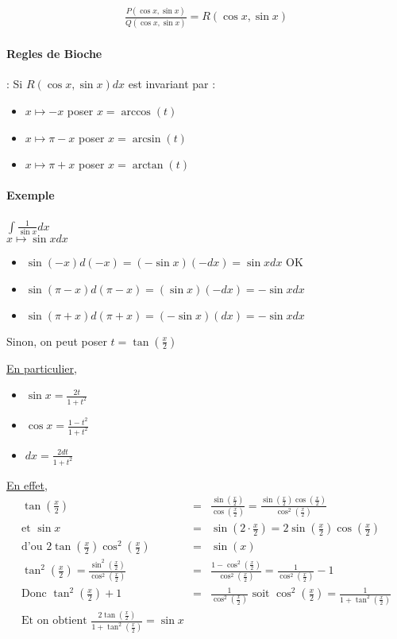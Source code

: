 \[\begin{array}{c}
	\frac{P(\cos x, \sin x)}{Q(\cos x, \sin x)} = R(\cos x, \sin x) \end{array}\]

\paragraph{Regles de Bioche} : Si $R(\cos x, \sin x) dx$ est invariant par : \begin{itemize}
\item $x \mapsto -x$ poser $x = \arccos (t)$ 
\item $x \mapsto \pi - x$ poser $x = \arcsin (t)$
\item $x \mapsto \pi + x$ poser $x = \arctan (t)$

\end{itemize}

\paragraph{Exemple} $\int \frac{1}{\sin x} dx$ ~\\
$x \mapsto \sin x dx$

\begin{itemize}
	\item $\sin(-x)d(-x) = (-\sin x)(-dx) = \sin x dx$ OK
	\item $\sin(\pi -x)d(\pi - x) = (\sin x)(-dx) = -\sin x dx$
	\item $\sin(\pi + x)d(\pi + x) = (-\sin x)(dx) = -\sin x dx$
\end{itemize}

Sinon, on peut poser $t = \tan (\frac{x}{2})$

\ul{En particulier}, \begin{itemize}
\item $\sin x = \frac{2t}{1+t^2}$ 
\item $\cos x = \frac{1-t^2}{1+t^2}$
\item $dx = \frac{2dt}{1+t^2}$
\end{itemize}

\ul{En effet}, \[\begin{array}{rcl}
\tan(\frac{x}{2}) &=& \frac{\sin(\frac{x}{2})}{\cos(\frac{x}{2})} = \frac{\sin(\frac{x}{2})\cos(\frac{x}{2})}{\cos^2(\frac{x}{2})} \\
\text{et } \sin x &=& \sin(2\cdot \frac{x}{2}) = 2\sin(\frac{x}{2})\cos(\frac{x}{2}) \\
\text{d'ou } 2\tan(\frac{x}{2})\cos^2(\frac{x}{2}) &=& \sin(x) \\
\tan^2 (\frac{x}{2}) = \frac{\sin^2(\frac{x}{2})}{\cos^2(\frac{x}{2})} &=& \frac{1-\cos^2(\frac{x}{2})}{\cos^2(\frac{x}{2})} = \frac{1}{\cos^2(\frac{x}{2})} - 1 \\
\text{Donc } \tan^2(\frac{x}{2})+1 &=& \frac{1}{\cos^2(\frac{x}{2})} \text{ soit } \cos^2(\frac{x}{2}) = \frac{1}{1+\tan^2(\frac{x}{2})} \\
\text{Et on obtient } \frac{2\tan(\frac{x}{2})}{1+\tan^2(\frac{x}{2})} = \sin x \end{array}\]

